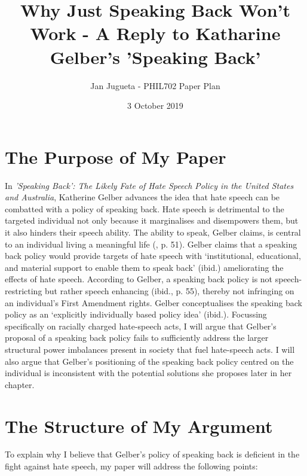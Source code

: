 \documentclass{article}
\title{Why Just Speaking Back Won't Work - A Reply to Katharine Gelber's 'Speaking Back'}
\author{Jan Jugueta - PHIL702 Paper Plan}
\date{3 October 2019}
\begin{document}
\maketitle

\section{The Purpose of My Paper}

In \textit{’Speaking Back’: The Likely Fate of Hate Speech Policy in the United States and Australia}, Katherine Gelber advances the idea that hate speech can be combatted with a policy of speaking back. Hate speech is detrimental to the targeted individual not only because it marginalises and disempowers them, but it also hinders their speech ability. The ability to speak, Gelber claims, is central to an individual living a meaningful life (\cite{gelber}, p. 51). Gelber claims that a speaking back policy would provide targets of hate speech with ‘institutional, educational, and material support to enable them to speak back’ (ibid.)  ameliorating the effects of hate speech. According to Gelber, a speaking back policy is not speech-restricting but rather speech enhancing (ibid., p. 55), thereby not infringing on an individual’s First Amendment rights. Gelber conceptualises the speaking back policy as an ‘explicitly individually based policy idea’ (ibid.). Focussing specifically on racially charged hate-speech acts, I will argue that Gelber’s proposal of a speaking back policy fails to sufficiently address the larger structural power imbalances present in society that fuel hate-speech acts. I will also argue that Gelber’s positioning of the speaking back policy centred on the individual is inconsistent with the potential solutions she proposes later in her chapter.

\section{The Structure of My Argument}

To explain why I believe that Gelber’s policy of speaking back is deficient in the fight against hate speech, my paper will address the following points:
\end{document}
